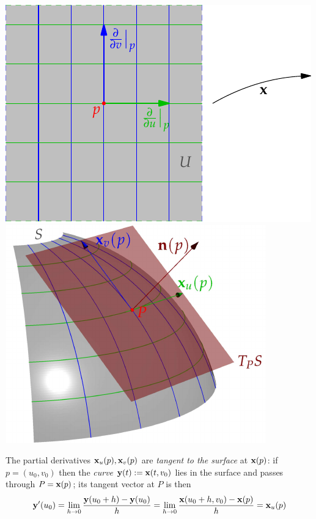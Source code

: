 \begin{center}\label{sec:map}
	\includegraphics[scale=0.95]{surfaces-paramU}\quad	\href{http://www.math.uci.edu/~ndonalds/math162a/surfaces-param.html}{\includegraphics[scale=0.95]{surfaces-param}}
\end{center}


The partial derivatives ${\mathbf{x}}_u(p),{\mathbf{x}}_v(p)$ are \emph{tangent to the surface} at ${\mathbf{x}}(p)$: if $p=(u_0,v_0)$ then the \emph{curve} ${\mathbf{y}}(t):={\mathbf{x}}(t,v_0)$ lies in the surface and passes through $P={\mathbf{x}}(p)$; its tangent vector at $P$ is then
\[
	{\mathbf{y}}'(u_0)=\lim_{h\to 0}\frac{{\mathbf{y}}(u_0+h)-{\mathbf{y}}(u_0)}h =\lim_{h\to 0}\frac{{\mathbf{x}}(u_0+h,v_0)-{\mathbf{x}}(p)}h  ={\mathbf{x}}_u(p)
\]

\goodbreak
 

